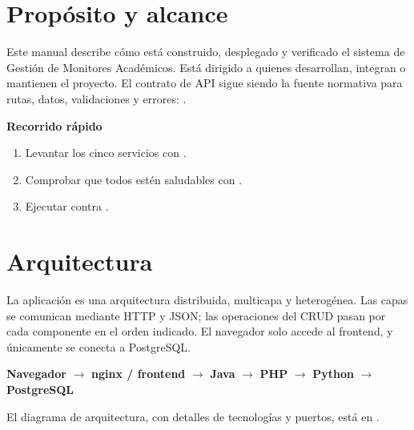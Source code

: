 



\tableofcontents
\clearpage
{}

\section{Propósito y alcance}

Este manual describe cómo está construido, desplegado y verificado el sistema de Gestión de Monitores Académicos. Está dirigido a quienes desarrollan, integran o mantienen el proyecto. El contrato de API sigue siendo la fuente normativa para rutas, datos, validaciones y errores: .

\textbf{Recorrido rápido}
\begin{enumerate}
  \item Levantar los cinco servicios con .
  \item Comprobar que todos estén saludables con .
  \item Ejecutar  contra .
\end{enumerate}

\section{Arquitectura}

La aplicación es una arquitectura distribuida, multicapa y heterogénea. Las capas se comunican mediante HTTP y JSON; las operaciones del CRUD pasan por cada componente en el orden indicado. El navegador solo accede al frontend, y únicamente  se conecta a PostgreSQL.

\begin{center}
\textbf{Navegador} $\rightarrow$ \textbf{nginx / frontend} $\rightarrow$ \textbf{Java} $\rightarrow$ \textbf{PHP} $\rightarrow$ \textbf{Python} $\rightarrow$ \textbf{PostgreSQL}
\end{center}

El diagrama de arquitectura, con detalles de tecnologías y puertos, está en \href{run:arquitectura.pdf}{}.

